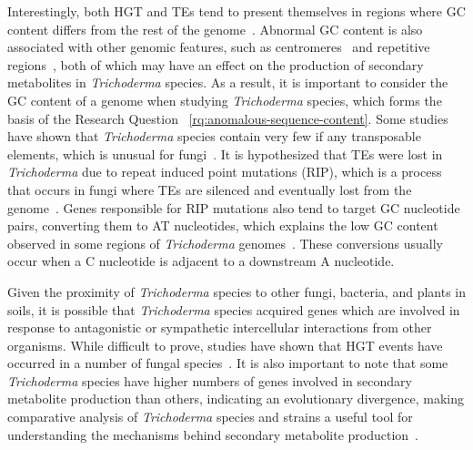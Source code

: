 Interestingly, both HGT and TEs tend to present themselves in regions where GC content differs from the rest of the genome~\cite{goncalves2024}. Abnormal GC content is also associated with other genomic features, such as centromeres~\cite{plohl2014a} and repetitive regions~\cite{winter2018}, both of which may have an effect on the production of secondary metabolites in \textit{Trichoderma} species. As a result, it is important to consider the GC content of a genome when studying \textit{Trichoderma} species, which forms the basis of the Research Question ~\ref{rq:anomalous-sequence-content}. Some studies have shown that \textit{Trichoderma} species contain very few if any transposable elements, which is unusual for fungi~\cite{kubicek2011}. It is hypothesized that TEs were lost in \textit{Trichoderma} due to repeat induced point mutations (RIP), which is a process that occurs in fungi where TEs are silenced and eventually lost from the genome~\cite{kubicek2011}. Genes responsible for RIP mutations also tend to target GC nucleotide pairs, converting them to AT nucleotides, which explains the low GC content observed in some regions of \textit{Trichoderma} genomes~\cite{goncalves2024}. These conversions usually occur when a C nucleotide is adjacent to a downstream A nucleotide.


Given the proximity of \textit{Trichoderma} species to other fungi, bacteria, and plants in soils, it is possible that \textit{Trichoderma} species acquired genes which are involved in response to antagonistic or sympathetic intercellular interactions from other organisms. While difficult to prove, studies have shown that HGT events have occurred in a number of fungal species~\cite{fitzpatrick2012}. It is also important to note that some \textit{Trichoderma} species have higher numbers of genes involved in secondary metabolite production than others, indicating an evolutionary divergence, making comparative analysis of \textit{Trichoderma} species and strains a useful tool for understanding the mechanisms behind secondary metabolite production~\cite{Mukherjee2012}.

